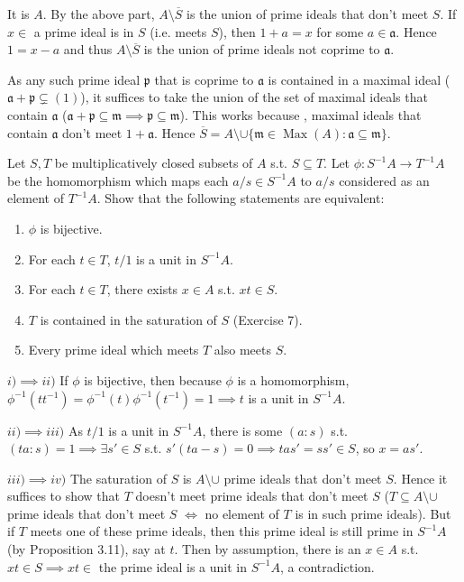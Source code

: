 \documentclass[a4paper]{exam}
\begin{document}
\begin{questions}
\begin{solution}
	It is $A $.
	By the above part, $A \setminus \overline{S}  $ is the union of prime ideals that don't meet $S $.
	If $x\in $ a prime ideal is in $S $ (i.e. meets $S $), then $1 +a = x $ for some $a \in \mathfrak{a} $.
	Hence $1 = x-a $ and thus $A \setminus \overline{S}$ is the union of prime ideals not coprime to $\mathfrak{a} $.

	As any such prime ideal $\mathfrak{p} $ that is coprime to $\mathfrak{a}$ is contained in a maximal ideal ($\mathfrak{a} + \mathfrak{p} \subsetneq (1) $), it suffices to take the union of the set of maximal ideals that contain $\mathfrak{a} $ ($\mathfrak{a}+\mathfrak{p}\subseteq \mathfrak{m} \implies \mathfrak{p} \subseteq \mathfrak{m} $).
	This works because , maximal ideals that contain $\mathfrak{a} $ don't meet $1 + \mathfrak{a} $.
	Hence $\overline{S} = A \setminus \cup \{\mathfrak{m}\in \operatorname{Max}(A): \mathfrak{a} \subseteq \mathfrak{m}\} $.
\end{solution}

\question Let $S,T $ be multiplicatively closed subsets of $A $ s.t. $S\subseteq T $. Let $\phi : S^{-1}A \to T^{-1}A $ be the homomorphism which maps each $a / s \in S^{-1}A $ to $a/s$ considered as an element of $T^{-1}A $. Show that the following statements are equivalent:
\begin{enumerate}
	\item $\phi  $ is bijective.
	\item For each $t\in T $, $t / 1 $ is a unit in $S^{-1}A $.
	\item For each $t \in T $, there exists $x\in A $ s.t. $xt \in S $.
	\item $T $ is contained in the saturation of $S $ (Exercise 7).
	\item Every prime ideal which meets $T $ also meets $S $.
\end{enumerate}
\begin{solution}
	$i) \implies ii) $ If $\phi  $ is bijective, then because $\phi  $ is a homomorphism, $\phi ^{-1}(t t^{-1}) = \phi ^{-1}(t)\phi ^{-1}(t^{-1}) = 1 \implies t $ is a unit in $S^{-1}A $.

	$ii)\implies iii) $ As $t / 1 $ is a unit in $S^{-1}A $, there is some $(a:s) $ s.t. $(ta:s) = 1 \implies \exists s' \in S $ s.t. $s'(ta-s) = 0 \implies tas' = ss' \in S $, so $x = as' $.

	$iii)\implies iv) $ The saturation of $S $ is $A \setminus \cup  $ prime ideals that don't meet $S $.
	Hence it suffices to show that $T $ doesn't meet prime ideals that don't meet $S $ ($T\subseteq A \setminus \cup $ prime ideals that don't meet $S $ $\iff $ no element of $T $ is in such prime ideals).
	But if $T $ meets one of these prime ideals, then this prime ideal is still prime in $S^{-1}A $ (by Proposition 3.11), say at $t $.
	Then by assumption, there is an $x \in A$ s.t. $xt \in S \implies xt \in$ the prime ideal is a unit in $S^{-1}A $, a contradiction.


\end{solution}
\end{questions}
\end{document}
